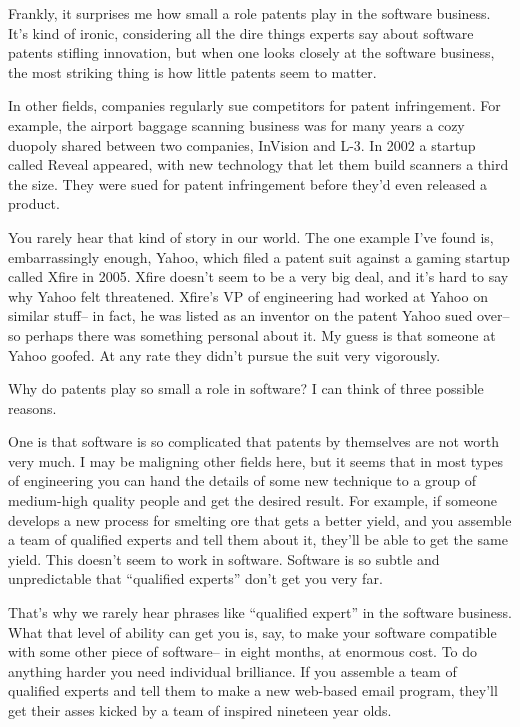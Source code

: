 Frankly, it surprises me how small a role patents play in the software
business. It's kind of ironic, considering all the dire things experts
say about software patents stifling innovation, but when one looks
closely at the software business, the most striking thing is how little
patents seem to matter.

In other fields, companies regularly sue competitors for patent
infringement. For example, the airport baggage scanning business was for
many years a cozy duopoly shared between two companies, InVision and
L-3. In 2002 a startup called Reveal appeared, with new technology that
let them build scanners a third the size. They were sued for patent
infringement before they'd even released a product.

You rarely hear that kind of story in our world. The one example I've
found is, embarrassingly enough, Yahoo, which filed a patent suit
against a gaming startup called Xfire in 2005. Xfire doesn't seem to be
a very big deal, and it's hard to say why Yahoo felt threatened. Xfire's
VP of engineering had worked at Yahoo on similar stuff-- in fact, he was
listed as an inventor on the patent Yahoo sued over-- so perhaps there
was something personal about it. My guess is that someone at Yahoo
goofed. At any rate they didn't pursue the suit very vigorously.

Why do patents play so small a role in software? I can think of three
possible reasons.

One is that software is so complicated that patents by themselves are
not worth very much. I may be maligning other fields here, but it seems
that in most types of engineering you can hand the details of some new
technique to a group of medium-high quality people and get the desired
result. For example, if someone develops a new process for smelting ore
that gets a better yield, and you assemble a team of qualified experts
and tell them about it, they'll be able to get the same yield. This
doesn't seem to work in software. Software is so subtle and
unpredictable that ``qualified experts'' don't get you very far.

That's why we rarely hear phrases like ``qualified expert'' in the
software business. What that level of ability can get you is, say, to
make your software compatible with some other piece of software-- in
eight months, at enormous cost. To do anything harder you need
individual brilliance. If you assemble a team of qualified experts and
tell them to make a new web-based email program, they'll get their asses
kicked by a team of inspired nineteen year olds.

